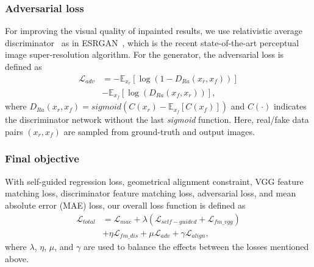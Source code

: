 \documentclass[journal]{IEEEtran}
\begin{document}
\subsubsection{Adversarial loss}
For improving the visual quality of inpainted results, we use relativistic average discriminator~\cite{RaGAN} as in ESRGAN~\cite{ESRGAN}, which is the recent state-of-the-art perceptual image super-resolution algorithm. For the generator, the adversarial loss is defined as
\begin{equation}\label{eq:advsarial-loss}
\begin{aligned}
{{\mathcal L}_{adv}} &=  - {\mathbb{E}_{{x_r}}}\left[ {\log \left( {1 - D_{Ra}\left( {{x_r},{x_f}} \right)} \right)} \right] \\&- {\mathbb{E}_{{x_f}}}\left[ {\log \left( {D_{Ra}\left( {{x_f},{x_r}} \right)} \right)} \right],
\end{aligned}
\end{equation}
where ${D_{Ra}}\left( {{x_r},{x_f}} \right) = sigmoid \left( {C\left( {{x_r}} \right) - {\mathbb{E}_{{x_f}}}\left[ {C\left( {{x_f}} \right)} \right]} \right)$ and $C\left(\cdot\right)$ indicates the discriminator network without the last \emph{sigmoid} function. Here, real/fake data pairs $\left( {{x_r},{x_f}} \right)$ are sampled from ground-truth and output images.

\subsubsection{Final objective}
With self-guided regression loss, geometrical alignment constraint, VGG feature matching loss, discriminator feature matching loss, adversarial loss, and mean absolute error (MAE) loss, our overall loss function is defined as
\begin{equation}\label{eq:total-loss}
\begin{aligned}
{{\mathcal L}_{total}} &= {{\mathcal L}_{mae}} + \lambda \left( {{{\mathcal L}_{self - guided}}  + {{\mathcal L}_{fm\_vgg}}} \right) \\&+ \eta {{\mathcal L}_{fm\_dis}} + \mu {{\mathcal L}_{adv}} + \gamma {{\mathcal L}_{align}},
\end{aligned}
\end{equation}
where $\lambda $, $\eta $, $\mu $, and $\gamma $ are used to balance the effects between the losses mentioned above.
\end{document}
